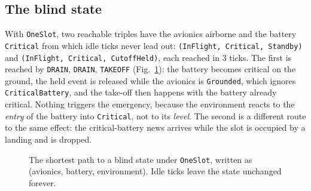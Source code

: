 \documentclass[review]{jfp-epi}
\newcommand{\code}[1]{\texttt{#1}}
\begin{document}
\subsection{The blind state}

With \code{OneSlot}, two reachable triples have the avionics airborne and the battery \code{Critical} from which idle ticks never lead out: \code{(InFlight, Critical, Standby)} and \code{(InFlight, Critical, CutoffHeld)}, each reached in 3 ticks. The first is reached by \code{DRAIN}, \code{DRAIN}, \code{TAKEOFF} (Fig.~\ref{fig:lasso}): the battery becomes critical on the ground, the held event is released while the avionics is \code{Grounded}, which ignores \code{CriticalBattery}, and the take-off then happens with the battery already critical. Nothing triggers the emergency, because the environment reacts to the \emph{entry} of the battery into \code{Critical}, not to its \emph{level}. The second is a different route to the same effect: the critical-battery news arrives while the slot is occupied by a landing and is dropped.

\begin{figure}[t]
\centering
\footnotesize
{}
\caption{The shortest path to a blind state under \code{OneSlot}, written as (avionics, battery, environment). Idle ticks leave the state unchanged forever.}
\label{fig:lasso}
\end{figure}
\end{document}
